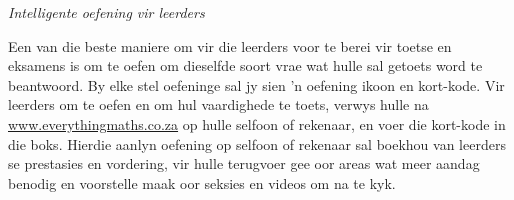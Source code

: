 \newpage
\thispagestyle{empty}
{\Large


{\normalfont\sffamily\fontsize{22}\normalfont\itshape Intelligente oefening vir leerders} \par


Een van die beste maniere om vir die leerders voor te berei vir toetse en eksamens is om te oefen om dieselfde soort vrae wat hulle sal getoets word te beantwoord. By elke stel oefeninge sal jy sien 'n oefening ikoon en kort-kode.
Vir leerders om te oefen en om hul vaardighede te toets, verwys hulle na \underline{www.everythingmaths.co.za} op hulle selfoon of rekenaar, en voer die kort-kode in die boks.
Hierdie aanlyn oefening op selfoon of rekenaar sal boekhou van leerders se prestasies en vordering, vir hulle terugvoer gee oor areas wat meer aandag benodig en voorstelle maak oor seksies en videos om na te kyk. \par


}
